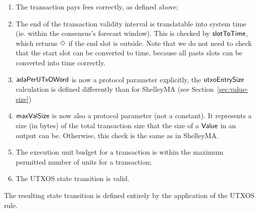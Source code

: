\begin{enumerate}
  \item The transaction pays fees correctly, as defined above;

  \item The end of the transaction validity interval is translatable into
  system time (ie. within the consensus's forecast window). This is checked
  by $\mathsf{slotToTime}$, which returns $\Diamond$ if the end slot is outside.
  Note that we do not need to check that the start slot can be converted to
  time, because all pasts slots can be converted into time correctly.

  \item $\mathsf{adaPerUTxOWord}$ is now a protocol parameter explicitly, the
  $\mathsf{utxoEntrySize}$ calculation is defined differently than for ShelleyMA
  (see Section~\ref{sec:value-size})

  \item $\mathsf{maxValSize}$ is now also a protocol parameter (not a constant).
  It represents a size (in bytes) of the total transaction
  size that the size of a $\mathsf{Value}$ in an output can be. Otherwise, this check is
  the same as in ShelleyMA.

 \item The execution unit budget for a transaction is within the maximum
  permitted number of units for a transaction;

  \item The UTXOS state transition is valid.
\end{enumerate}

The resulting state transition is defined entirely by the application of the
UTXOS rule.

